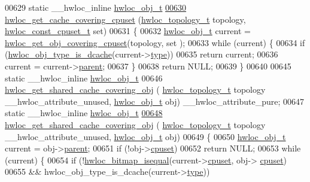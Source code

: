 \begin{DoxyCode}
00629 \textcolor{keyword}{static} \_\_hwloc\_inline \hyperlink{a00238}{hwloc\_obj\_t}
\hyperlink{a00199_gac4cd480a5deaa4ada047fdd11ae4c070}{00630} \hyperlink{a00199_gac4cd480a5deaa4ada047fdd11ae4c070}{hwloc\_get\_cache\_covering\_cpuset} (\hyperlink{a00186_ga9d1e76ee15a7dee158b786c30b6a6e38}{hwloc\_topology\_t} topology, 
      \hyperlink{a00183_ga1f784433e9b606261f62d1134f6a3b25}{hwloc\_const\_cpuset\_t} \textcolor{keyword}{set})
00631 \{
00632   \hyperlink{a00238}{hwloc\_obj\_t} current = \hyperlink{a00196_ga41acdcdbb8b95d70ecf6c572a3f67dca}{hwloc\_get\_obj\_covering\_cpuset}(topology, \textcolor{keyword}{set}
      );
00633   \textcolor{keywordflow}{while} (current) \{
00634     \textcolor{keywordflow}{if} (\hyperlink{a00198_ga395e48cd221d107e5891689624e1aec4}{hwloc\_obj\_type\_is\_dcache}(current->\hyperlink{a00238_acc4f0803f244867e68fe0036800be5de}{type}))
00635       \textcolor{keywordflow}{return} current;
00636     current = current->\hyperlink{a00238_adc494f6aed939992be1c55cca5822900}{parent};
00637   \}
00638   \textcolor{keywordflow}{return} NULL;
00639 \}
00640 
00645 \textcolor{keyword}{static} \_\_hwloc\_inline \hyperlink{a00238}{hwloc\_obj\_t}
00646 \hyperlink{a00199_ga36f48c32837c7a70b424706e213dcd71}{hwloc\_get\_shared\_cache\_covering\_obj} (
      \hyperlink{a00186_ga9d1e76ee15a7dee158b786c30b6a6e38}{hwloc\_topology\_t} topology \_\_hwloc\_attribute\_unused, \hyperlink{a00238}{hwloc\_obj\_t} obj) 
      \_\_hwloc\_attribute\_pure;
00647 \textcolor{keyword}{static} \_\_hwloc\_inline \hyperlink{a00238}{hwloc\_obj\_t}
\hyperlink{a00199_ga36f48c32837c7a70b424706e213dcd71}{00648} \hyperlink{a00199_ga36f48c32837c7a70b424706e213dcd71}{hwloc\_get\_shared\_cache\_covering\_obj} (
      \hyperlink{a00186_ga9d1e76ee15a7dee158b786c30b6a6e38}{hwloc\_topology\_t} topology \_\_hwloc\_attribute\_unused, \hyperlink{a00238}{hwloc\_obj\_t} obj)
00649 \{
00650   \hyperlink{a00238}{hwloc\_obj\_t} current = obj->\hyperlink{a00238_adc494f6aed939992be1c55cca5822900}{parent};
00651   \textcolor{keywordflow}{if} (!obj->\hyperlink{a00238_a67925e0f2c47f50408fbdb9bddd0790f}{cpuset})
00652     \textcolor{keywordflow}{return} NULL;
00653   \textcolor{keywordflow}{while} (current) \{
00654     \textcolor{keywordflow}{if} (!\hyperlink{a00205_ga32376b1405e57472b73c3aa53bb39663}{hwloc\_bitmap\_isequal}(current->\hyperlink{a00238_a67925e0f2c47f50408fbdb9bddd0790f}{cpuset}, obj->
      \hyperlink{a00238_a67925e0f2c47f50408fbdb9bddd0790f}{cpuset})
00655         && hwloc\_obj\_type\_is\_dcache(current->\hyperlink{a00238_acc4f0803f244867e68fe0036800be5de}{type}))

\end{DoxyCode}
